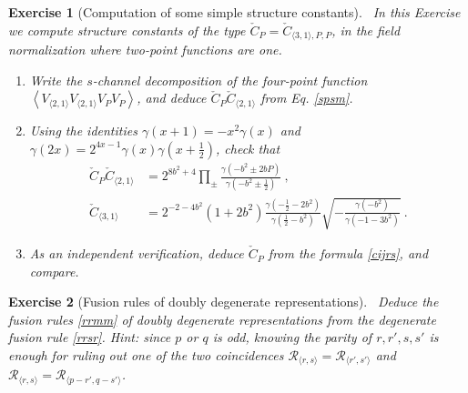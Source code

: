 \documentclass[12pt, a4paper, notitlepage, twoside]{report}
\numberwithin{equation}{section}
\theoremstyle{break}
\newtheorem{exo}{Exercise}[chapter]
\begin{document}
\begin{exo}[Computation of some simple structure constants]
 ~\label{exosssc}
 In this Exercise we compute structure constants of the type $\check{C}_P = \check{C}_{\langle 3,1\rangle, P,P}$, in the field normalization where two-point functions are one. 
\begin{enumerate}
\item Write the $s$-channel decomposition of the four-point function $\left< V_{\langle 2,1\rangle} V_{\langle 2,1\rangle} V_PV_P\right>$, and deduce $\check{C}_P \check{C}_{\langle 2,1\rangle}$ from Eq. \eqref{spsm}.
\item Using the identities $\gamma(x+1)=-x^2\gamma(x)$ and $\gamma(2x)= 2^{4x-1}\gamma(x)\gamma(x+\tfrac12)$, check that
\begin{align}
 \check{C}_P \check{C}_{\langle 2,1\rangle} &= 2^{8b^2+4} \prod_\pm \frac{\gamma(-b^2\pm 2bP)}{\gamma(-b^2\pm \frac12)} \ ,
 \\
 \check{C}_{\langle 3,1\rangle} &= 2^{-2-4b^2}(1+2b^2)\frac{\gamma(-\tfrac12-2b^2)}{\gamma(\tfrac12-b^2)}\sqrt{-\frac{\gamma(-b^2)}{\gamma(-1-3b^2)}}\ .
 \label{cto}
\end{align}
 \item As an independent verification, deduce $\check{C}_P$ from the formula \eqref{cijrs}, and compare.
\end{enumerate}
\end{exo}

 
\begin{exo}[Fusion rules of doubly degenerate representations]
 ~\label{exofus}
Deduce the fusion rules \eqref{rrmm} of doubly degenerate representations from the degenerate fusion rule \eqref{rrsr}. 
Hint: since $p$ or $q$ is odd, knowing the parity of $r, r', s, s'$ is enough for ruling out one of the two coincidences $\mathcal{R}_{\langle r,s\rangle} = \mathcal{R}_{\langle r',s'\rangle}$ and $\mathcal{R}_{\langle r,s\rangle} = \mathcal{R}_{\langle p-r',q-s'\rangle}$.
\end{exo}
\end{document}
